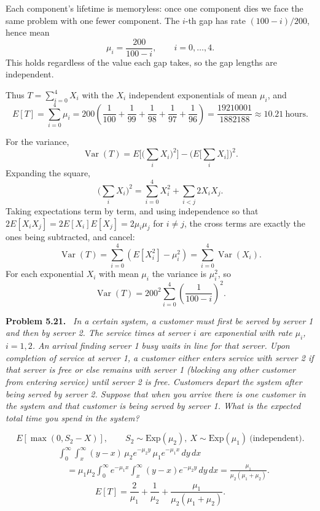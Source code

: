 \documentclass[11pt]{article}
\newenvironment{problem}[1]
  {\par\medskip\noindent\textbf{Problem #1.}\ \itshape}
  {\par\medskip}
\begin{document}
Each component's lifetime is memoryless: once one component dies we face the same problem with one fewer component. The $i$-th gap has rate $(100-i)/200$, hence mean
$$\mu_i=\frac{200}{100-i},\qquad i=0,\dots,4 .$$
This holds regardless of the value each gap takes, so the gap lengths are independent.

Thus $T=\sum_{i=0}^{4}X_i$ with the $X_i$ independent exponentials of mean $\mu_i$, and
$$E[T]=\sum_{i=0}^{4}\mu_i=200\left(\frac{1}{100}+\frac{1}{99}+\frac{1}{98}+\frac{1}{97}+\frac{1}{96}\right)=\frac{19210001}{1882188}\approx 10.21\ \text{hours}.$$

For the variance,
$$\operatorname{Var}(T)=E\Big[\Big(\sum_i X_i\Big)^2\Big]-\Big(E\Big[\sum_i X_i\Big]\Big)^2 .$$
Expanding the square,
$$\Big(\sum_i X_i\Big)^2=\sum_{i=0}^{4}X_i^2+\sum_{i<j}2X_iX_j .$$
Taking expectations term by term, and using independence so that $2E[X_iX_j]=2E[X_i]E[X_j]=2\mu_i\mu_j$ for $i\neq j$, the cross terms are exactly the ones being subtracted, and cancel:
$$\operatorname{Var}(T)=\sum_{i=0}^{4}\left(E[X_i^2]-\mu_i^2\right)=\sum_{i=0}^{4}\operatorname{Var}(X_i).$$
For each exponential $X_i$ with mean $\mu_i$ the variance is $\mu_i^2$, so
$$\operatorname{Var}(T)=200^2\sum_{i=0}^{4}\left(\frac{1}{100-i}\right)^2 .$$

\begin{problem}{5.21}
In a certain system, a customer must first be served by server 1 and then by server 2. The service times at server $i$ are exponential with rate $\mu_i$, $i=1,2$. An arrival finding server 1 busy waits in line for that server. Upon completion of service at server 1, a customer either enters service with server 2 if that server is free or else remains with server 1 (blocking any other customer from entering service) until server 2 is free. Customers depart the system after being served by server 2. Suppose that when you arrive there is one customer in the system and that customer is being served by server 1. What is the expected total time you spend in the system?
\end{problem}
$$E[\max(0,S_2-X)],\qquad S_2\sim\mathrm{Exp}(\mu_2),\ X\sim\mathrm{Exp}(\mu_1)\ \text{(independent)}.$$
$$\begin{aligned}
&\int_0^\infty\int_x^\infty (y-x)\,\mu_2 e^{-\mu_2 y}\,\mu_1 e^{-\mu_1 x}\,dy\,dx\\
&\quad =\mu_1\mu_2\int_0^\infty e^{-\mu_1 x}\int_x^\infty (y-x)e^{-\mu_2 y}\,dy\,dx
=\frac{\mu_1}{\mu_2(\mu_1+\mu_2)}.
\end{aligned}$$
$$E[T]=\frac{2}{\mu_1}+\frac{1}{\mu_2}+\frac{\mu_1}{\mu_2(\mu_1+\mu_2)}.$$
\end{document}
